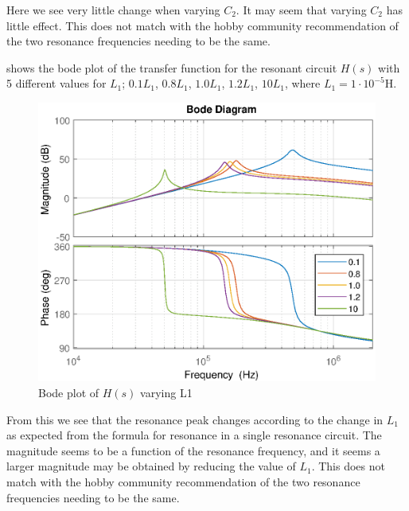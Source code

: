 Here we see very little change when varying $C_2$. It may seem that varying $C_2$ has little effect. This does not match with the hobby community recommendation of the two resonance frequencies needing to be the same.

\newpage
{} shows the bode plot of the transfer function for the resonant circuit $H(s)$ with 5 different values for $L_1$; $0.1 L_1$, $0.8 L_1$, $1.0 L_1$, $1.2 L_1$, $10 L_1$, where $L_1 = 1 \cdot 10^{-5}$H.

\begin{figure}[H]
    \centering
    \includegraphics[width=\textwidth]{img/CoilRigBode_L1.eps}
    \caption{Bode plot of $H(s)$ varying L1}
    \label{fig:bode_l1}
\end{figure}

From this we see that the resonance peak changes according to the change in $L_1$ as expected from the formula for resonance in a single resonance circuit. The magnitude seems to be a function of the resonance frequency, and it seems a larger magnitude may be obtained by reducing the value of $L_1$. This does not match with the hobby community recommendation of the two resonance frequencies needing to be the same.

